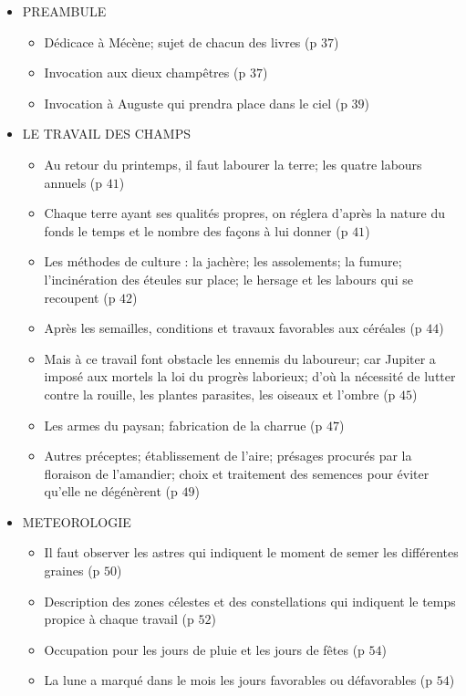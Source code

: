\documentclass[a4paper, 11pt, hidelinks]{article}
\begin{document}
\begin{itemize}
    \item PREAMBULE \begin{itemize}
        \item Dédicace à Mécène; sujet de chacun des livres (p $37$)
        \item Invocation aux dieux champêtres (p $37$)
        \item Invocation à Auguste qui prendra place dans le ciel (p $39$)
    \end{itemize}
    \item LE TRAVAIL DES CHAMPS \begin{itemize}
        \item Au retour du printemps, il faut labourer la terre; les quatre labours annuels (p $41$)
        \item Chaque terre ayant ses qualités propres, on réglera d'après la nature du fonds le temps et le nombre des façons à lui donner (p $41$)
        \item Les méthodes de culture : la jachère; les assolements; la fumure; l'incinération des éteules sur place; le hersage et les labours qui se recoupent (p $42$)
        \item Après les semailles, conditions et travaux favorables aux céréales (p $44$)
        \item Mais à ce travail font obstacle les ennemis du laboureur; car Jupiter a imposé aux mortels la loi du progrès laborieux; d'où la nécessité de lutter contre la rouille, les plantes parasites, les oiseaux et l'ombre (p $45$)
        \item Les armes du paysan; fabrication de la charrue (p $47$)
        \item Autres préceptes; établissement de l'aire; présages procurés par la floraison de l'amandier; choix et traitement des semences pour éviter qu'elle ne dégénèrent (p $49$)
    \end{itemize}
    \item METEOROLOGIE \begin{itemize}
        \item Il faut observer les astres qui indiquent le moment de semer les différentes graines (p $50$)
        \item Description des zones célestes et des constellations qui indiquent le temps propice à chaque travail (p $52$)
        \item Occupation pour les jours de pluie et les jours de fêtes (p $54$)
        \item La lune a marqué dans le mois les jours favorables ou défavorables  (p $54$)

\end{itemize}
\end{itemize}
\end{document}
